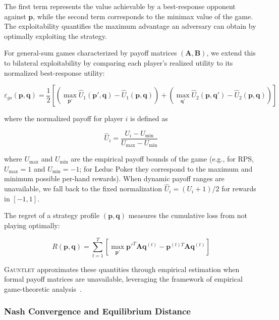 \documentclass[sigconf,anonymous]{aamas}
\begin{document}
The first term represents the value achievable by a best-response opponent against $\mathbf{p}$, while the second term corresponds to the minimax value of the game. The exploitability quantifies the maximum advantage an adversary can obtain by optimally exploiting the strategy.

For general-sum games characterized by payoff matrices $(\mathbf{A}, \mathbf{B})$, we extend this to bilateral exploitability by comparing each player's realized utility to its normalized best-response utility:

\begin{equation}
\varepsilon_{gs}(\mathbf{p}, \mathbf{q}) = \frac{1}{2}\left[\left(\max_{\mathbf{p}'} \hat{U}_1(\mathbf{p}', \mathbf{q}) - \hat{U}_1(\mathbf{p}, \mathbf{q})\right) + \left(\max_{\mathbf{q}'} \hat{U}_2(\mathbf{p}, \mathbf{q}') - \hat{U}_2(\mathbf{p}, \mathbf{q})\right)\right]
\label{eq:general_sum_exploit}
\end{equation}

where the normalized payoff for player $i$ is defined as

\begin{equation}
\hat{U}_i = \frac{U_i - U_{\min}}{U_{\max} - U_{\min}}
\label{eq:utility_normalization}
\end{equation}

where $U_{\max}$ and $U_{\min}$ are the empirical payoff bounds of the game (e.g., for RPS, $U_{\max}=1$ and $U_{\min}=-1$; for Leduc Poker they correspond to the maximum and minimum possible per-hand rewards). When dynamic payoff ranges are unavailable, we fall back to the fixed normalization $\hat{U}_i = (U_i + 1)/2$ for rewards in $[-1,1]$.

The regret of a strategy profile $(\mathbf{p}, \mathbf{q})$ measures the cumulative loss from not playing optimally:

\begin{equation}
R(\mathbf{p}, \mathbf{q}) = \sum_{t=1}^{T} \left[\max_{\mathbf{p}'} \mathbf{p}'^T \mathbf{A} \mathbf{q}^{(t)} - \mathbf{p}^{(t)T} \mathbf{A} \mathbf{q}^{(t)}\right]
\label{eq:regret}
\end{equation}

\textsc{Gauntlet} approximates these quantities through empirical estimation when formal payoff matrices are unavailable, leveraging the framework of empirical game-theoretic analysis~\cite{Wellman2006}.

\subsubsection{Nash Convergence and Equilibrium Distance}
\end{document}
